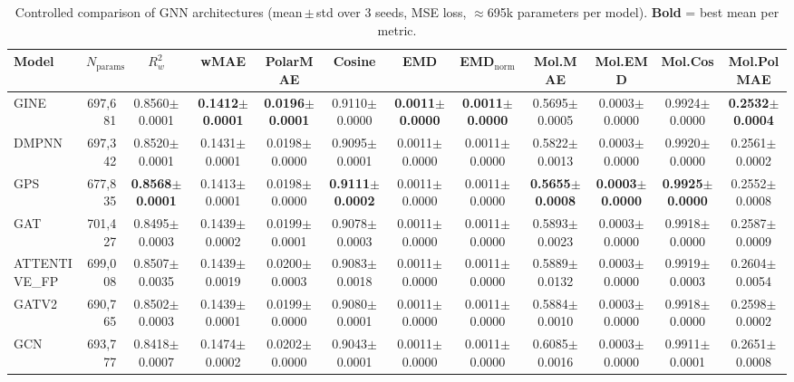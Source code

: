 \begin{table}[ht]
\centering
\caption{Controlled comparison of GNN architectures (mean\,$\pm$\,std over 3 seeds, MSE loss, $\approx$695k parameters per model). \textbf{Bold} = best mean per metric.}
\label{tab:benchmark_mse}
\small
\begin{tabular}{l r c c c c c c c c c c }
\toprule
Model & $N_{\text{params}}$ & $R^2_w$ & wMAE & PolarMAE & Cosine & EMD & EMD$_\mathrm{norm}$ & Mol.MAE & Mol.EMD & Mol.Cos & Mol.PolMAE \\
\midrule
GINE & 697,681 & 0.8560$\pm$0.0001 & \textbf{0.1412$\pm$0.0001} & \textbf{0.0196$\pm$0.0001} & 0.9110$\pm$0.0000 & \textbf{0.0011$\pm$0.0000} & \textbf{0.0011$\pm$0.0000} & 0.5695$\pm$0.0005 & 0.0003$\pm$0.0000 & 0.9924$\pm$0.0000 & \textbf{0.2532$\pm$0.0004} \\
DMPNN & 697,342 & 0.8520$\pm$0.0001 & 0.1431$\pm$0.0001 & 0.0198$\pm$0.0000 & 0.9095$\pm$0.0001 & 0.0011$\pm$0.0000 & 0.0011$\pm$0.0000 & 0.5822$\pm$0.0013 & 0.0003$\pm$0.0000 & 0.9920$\pm$0.0000 & 0.2561$\pm$0.0002 \\
GPS & 677,835 & \textbf{0.8568$\pm$0.0001} & 0.1413$\pm$0.0001 & 0.0198$\pm$0.0000 & \textbf{0.9111$\pm$0.0002} & 0.0011$\pm$0.0000 & 0.0011$\pm$0.0000 & \textbf{0.5655$\pm$0.0008} & \textbf{0.0003$\pm$0.0000} & \textbf{0.9925$\pm$0.0000} & 0.2552$\pm$0.0008 \\
GAT & 701,427 & 0.8495$\pm$0.0003 & 0.1439$\pm$0.0002 & 0.0199$\pm$0.0001 & 0.9078$\pm$0.0003 & 0.0011$\pm$0.0000 & 0.0011$\pm$0.0000 & 0.5893$\pm$0.0023 & 0.0003$\pm$0.0000 & 0.9918$\pm$0.0000 & 0.2587$\pm$0.0009 \\
ATTENTIVE_FP & 699,008 & 0.8507$\pm$0.0035 & 0.1439$\pm$0.0019 & 0.0200$\pm$0.0003 & 0.9083$\pm$0.0018 & 0.0011$\pm$0.0000 & 0.0011$\pm$0.0000 & 0.5889$\pm$0.0132 & 0.0003$\pm$0.0000 & 0.9919$\pm$0.0003 & 0.2604$\pm$0.0054 \\
GATV2 & 690,765 & 0.8502$\pm$0.0003 & 0.1439$\pm$0.0001 & 0.0199$\pm$0.0000 & 0.9080$\pm$0.0001 & 0.0011$\pm$0.0000 & 0.0011$\pm$0.0000 & 0.5884$\pm$0.0010 & 0.0003$\pm$0.0000 & 0.9918$\pm$0.0000 & 0.2598$\pm$0.0002 \\
GCN & 693,777 & 0.8418$\pm$0.0007 & 0.1474$\pm$0.0002 & 0.0202$\pm$0.0000 & 0.9043$\pm$0.0001 & 0.0011$\pm$0.0000 & 0.0011$\pm$0.0000 & 0.6085$\pm$0.0016 & 0.0003$\pm$0.0000 & 0.9911$\pm$0.0001 & 0.2651$\pm$0.0008 \\
\bottomrule
\end{tabular}
\end{table}
